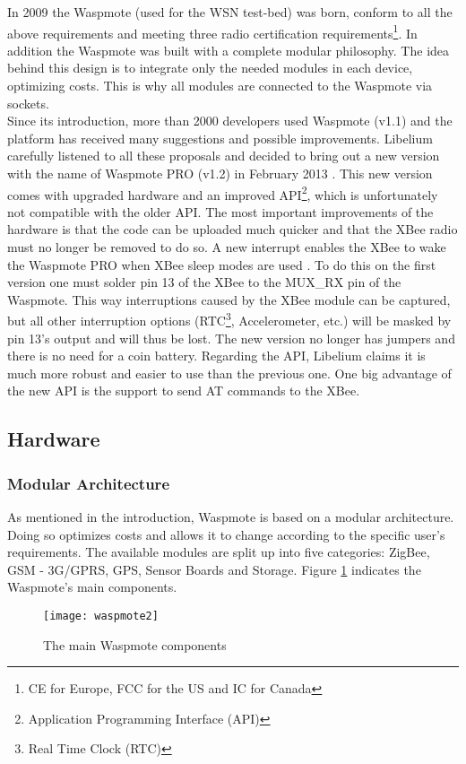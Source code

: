 In 2009 the Waspmote (used for the WSN test-bed) was born, conform to all the above requirements and meeting three radio certification requirements\footnote{CE for Europe, FCC for the US and IC for Canada}. In addition the Waspmote was built with a complete modular philosophy. The idea behind this design is to integrate only the needed modules in each device, optimizing costs. This is why all modules are connected to the Waspmote via sockets.\\Since its introduction, more than 2000 developers used Waspmote (v1.1) and the platform has received many suggestions and possible improvements. Libelium carefully listened to all these proposals and decided to bring out a new version with the name of Waspmote PRO (v1.2) in February 2013 . This new version comes with upgraded hardware and an improved API\footnote{Application Programming Interface (API)}, which is unfortunately not compatible with the older API. The most important improvements of the hardware is that the code can be uploaded much quicker and that the XBee radio must no longer be removed to do so. A new interrupt enables the XBee to wake the Waspmote PRO when XBee sleep modes are used . To do this on the first version one must solder pin 13 of the XBee to the MUX\_RX pin of the Waspmote. This way interruptions caused by the XBee module can be captured, but all other interruption options (RTC\footnote{Real Time Clock (RTC)}, Accelerometer, etc.) will be masked by pin 13's output and will thus be lost.  The new version no longer has jumpers and there is no need for a coin battery. Regarding the API, Libelium claims it is much more robust and easier to use than the previous one. One big advantage of the new API is the support to send AT commands to the XBee.
\subsection{Hardware}
\subsubsection{Modular Architecture}
As mentioned in the introduction, Waspmote is based on a modular architecture. Doing so optimizes costs and allows it to change according to the specific user's requirements. The available modules are split up into five categories: ZigBee, GSM - 3G/GPRS, GPS, Sensor Boards and Storage. Figure \ref{fig:waspMote1} indicates the Waspmote's main components.
\begin{figure}[ht]
\centering
\texttt{[image: waspmote2]}
\caption{The main Waspmote components}
\label{fig:waspMote1}
\end{figure}
